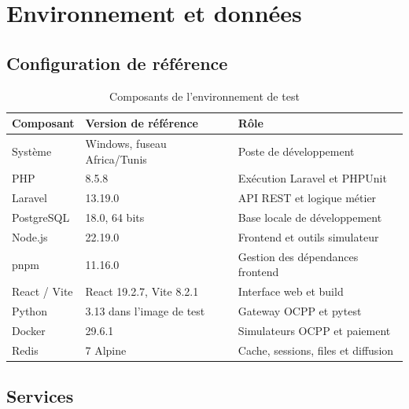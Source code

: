 \chapter{Environnement et données}

\section{Configuration de référence}

\begin{table}[H]
\centering
\caption{Composants de l'environnement de test}
\begin{tabularx}{\textwidth}{|L{3.4cm}|L{4.1cm}|Y|}
\hline
{}\textbf{Composant} & \textbf{Version de référence} & \textbf{Rôle} \\ \hline
Système & Windows, fuseau Africa/Tunis & Poste de développement \\ \hline
PHP & 8.5.8 & Exécution Laravel et PHPUnit \\ \hline
Laravel & 13.19.0 & API REST et logique métier \\ \hline
PostgreSQL & 18.0, 64 bits & Base locale de développement \\ \hline
Node.js & 22.19.0 & Frontend et outils simulateur \\ \hline
pnpm & 11.16.0 & Gestion des dépendances frontend \\ \hline
React / Vite & React 19.2.7, Vite 8.2.1 & Interface web et build \\ \hline
Python & 3.13 dans l'image de test & Gateway OCPP et pytest \\ \hline
Docker & 29.6.1 & Simulateurs OCPP et paiement \\ \hline
Redis & 7 Alpine & Cache, sessions, files et diffusion \\ \hline
\end{tabularx}
\end{table}

\section{Services}

